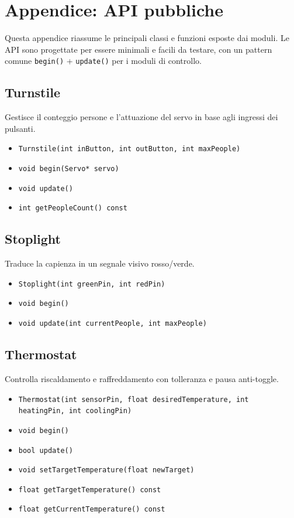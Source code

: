 \chapter{Appendice: API pubbliche}

Questa appendice riassume le principali classi e funzioni esposte dai moduli. Le API sono progettate per essere minimali e facili da testare, con un pattern comune \texttt{begin()} + \texttt{update()} per i moduli di controllo.

\section{Turnstile}
Gestisce il conteggio persone e l'attuazione del servo in base agli ingressi dei pulsanti.
\begin{itemize}
  \item \texttt{Turnstile(int inButton, int outButton, int maxPeople)}
  \item \texttt{void begin(Servo* servo)}
  \item \texttt{void update()}
  \item \texttt{int getPeopleCount() const}
\end{itemize}

\section{Stoplight}
Traduce la capienza in un segnale visivo rosso/verde.
\begin{itemize}
  \item \texttt{Stoplight(int greenPin, int redPin)}
  \item \texttt{void begin()}
  \item \texttt{void update(int currentPeople, int maxPeople)}
\end{itemize}

\section{Thermostat}
Controlla riscaldamento e raffreddamento con tolleranza e pausa anti-toggle.
\begin{itemize}
  \item \texttt{Thermostat(int sensorPin, float desiredTemperature, int}\\
        \texttt{heatingPin, int coolingPin)}
  \item \texttt{void begin()}
  \item \texttt{bool update()}
  \item \texttt{void setTargetTemperature(float newTarget)}
  \item \texttt{float getTargetTemperature() const}
  \item \texttt{float getCurrentTemperature() const}
\end{itemize}

